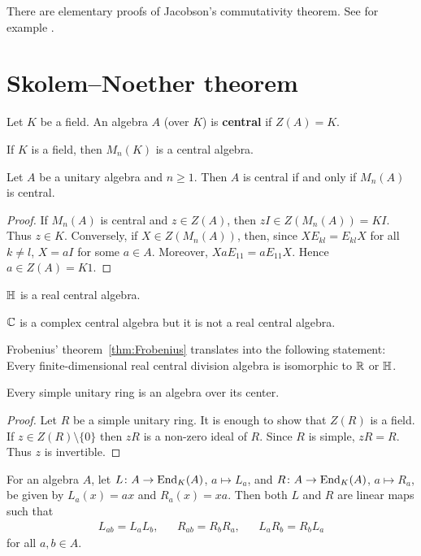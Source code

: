 There are elementary proofs of Jacobson's commutativity theorem.
See for example \cite{MR347890}. 

\section{Skolem--Noether theorem}

\begin{definition}
    Let $K$ be a field. 
	An algebra $A$ (over $K$) is \textbf{central} if $Z(A)=K$. 
\end{definition}

If $K$ is a field, then $M_n(K)$ is a central algebra.

\begin{proposition}
	Let $A$ be a unitary algebra and $n\geq1$. Then
	$A$ is central if and only if $M_n(A)$ is central.
\end{proposition}

\begin{proof}
	If $M_n(A)$ is central and $z\in Z(A)$, then
	$zI\in Z(M_n(A))=KI$. Thus
	$z\in K$. Conversely, if $X\in Z(M_n(A))$, then, since 
	$XE_{kl}=E_{kl}X$ for all $k\ne l$, $X=aI$ for some $a\in A$. 
	Moreover, 
	$XaE_{11}=aE_{11}X$. Hence $a\in Z(A)=K1$. 
\end{proof}

\begin{example}
	$\mathbb{H}$ is a real central algebra.
\end{example}

\begin{example}
	$\mathbb{C}$ is a complex central algebra but it is not a real central 
	algebra. 
\end{example}

Frobenius' theorem~\ref{thm:Frobenius} translates into 
the following statement: Every finite-dimensional  
real central division algebra is isomorphic to $\mathbb{R}$ or $\mathbb{H}$. 

\begin{proposition}
	Every simple unitary ring is an algebra over its center. 
\end{proposition}

\begin{proof}
	Let $R$ be a simple unitary ring. It is enough to show that
	$Z(R)$ is a field. If $z\in
	Z(R)\setminus\{0\}$ then $zR$ is a non-zero ideal of $R$. Since $R$
	is simple, $zR=R$. Thus $z$ is invertible. 
\end{proof}

For an algebra $A$, let $L\colon A\to\operatorname{End}_K(A)$,
$a\mapsto L_a$, and $R\colon A\to\operatorname{End}_K(A)$, $a\mapsto R_a$, be given by 
$L_a(x)=ax$ and $R_a(x)=xa$. Then both $L$ and $R$ are linear maps such that 
\begin{align*}
	L_{ab}=L_aL_b, && R_{ab}=R_bR_a, &&	L_aR_b=R_bL_a
\end{align*}
for all $a,b\in A$.

